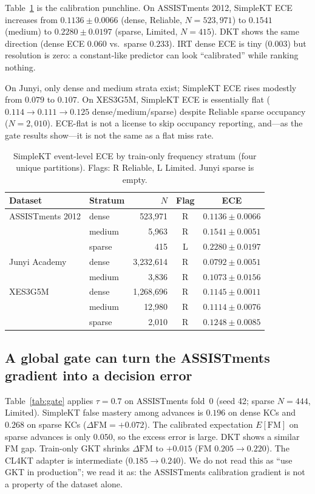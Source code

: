 \documentclass[journal,10pt,twocolumn]{IEEEtran}
\begin{document}
Table~\ref{tab:ece} is the calibration punchline. On ASSISTments 2012, SimpleKT ECE increases from $0.1136\pm0.0066$ (dense, Reliable, $N=523{,}971$) to $0.1541$ (medium) to $0.2280\pm0.0197$ (sparse, Limited, $N=415$). DKT shows the same direction (dense ECE $0.060$ vs.\ sparse $0.233$). IRT dense ECE is tiny ($0.003$) but resolution is zero: a constant-like predictor can look ``calibrated'' while ranking nothing.

On Junyi, only dense and medium strata exist; SimpleKT ECE rises modestly from $0.079$ to $0.107$. On XES3G5M, SimpleKT ECE is essentially flat ($0.114\to 0.111\to 0.125$ dense/medium/sparse) despite Reliable sparse occupancy ($N=2{,}010$). ECE-flat is not a license to skip occupancy reporting, and---as the gate results show---it is not the same as a flat miss rate.

\begin{table}[!t]
\caption{SimpleKT event-level ECE by train-only frequency stratum (four unique partitions). Flags: R Reliable, L Limited. Junyi sparse is empty.}
\label{tab:ece}
\centering
\footnotesize
\begin{tabular}{llrcc}
\toprule
Dataset & Stratum & $N$ & Flag & ECE \\
\midrule
ASSISTments 2012 & dense & 523{,}971 & R & $0.1136\pm0.0066$ \\
 & medium & 5{,}963 & R & $0.1541\pm0.0051$ \\
 & sparse & 415 & L & $0.2280\pm0.0197$ \\
\midrule
Junyi Academy & dense & 3{,}232{,}614 & R & $0.0792\pm0.0051$ \\
 & medium & 3{,}836 & R & $0.1073\pm0.0156$ \\
\midrule
XES3G5M & dense & 1{,}268{,}696 & R & $0.1145\pm0.0011$ \\
 & medium & 12{,}980 & R & $0.1114\pm0.0076$ \\
 & sparse & 2{,}010 & R & $0.1248\pm0.0085$ \\
\bottomrule
\end{tabular}
\end{table}

\subsection{A global gate can turn the ASSISTments gradient into a decision error}

Table~\ref{tab:gate} applies $\tau=0.7$ on ASSISTments fold~0 (seed 42; sparse $N=444$, Limited). SimpleKT false mastery among advances is $0.196$ on dense KCs and $0.268$ on sparse KCs ($\Delta\mathrm{FM}=+0.072$). The calibrated expectation $E[\mathrm{FM}]$ on sparse advances is only $0.050$, so the excess error is large. DKT shows a similar FM gap. Train-only GKT shrinks $\Delta\mathrm{FM}$ to $+0.015$ (FM $0.205\to 0.220$). The CL4KT adapter is intermediate ($0.185\to 0.240$). We do not read this as ``use GKT in production''; we read it as: the ASSISTments calibration gradient is not a property of the dataset alone.
\end{document}
